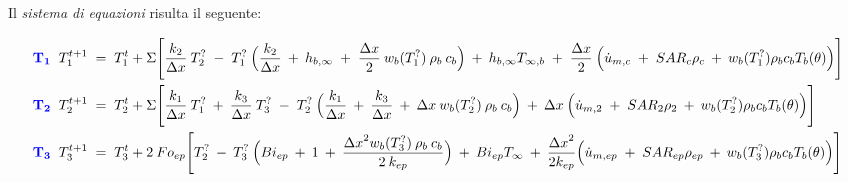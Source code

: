 \noindent
\hspace{1cm} Il \textit{sistema di equazioni} risulta il seguente:\\

\hspace{-1cm}
\begin{minipage}{\textwidth}
	{\footnotesize
	\begin{align*}
		\mbox{\textcolor{blue}{$\mathbf{T_{1}}$}} \;\;
		T_{1}^{t+1} \;&=\; T_1 ^t + \Sigma \Bigg[ \frac{k_{2}}{\Delta x}\: T_{2}^? \;-\; T_1^?\:\Big( \frac{k_{2}}{\Delta x} \:+\: h_{b,\infty} \;+\;  \frac{\Delta x}{2} \:  w_b (T_1^?) \: \rho _b \: c_b \Big) \:+\: h_{b, \infty} T_{\infty,b} \;+\; \frac{\Delta x}{2} \: \Big(\Dot{u}_{m,c} \;+\; SAR_{c} \rho_{c} \:+\:  w_b (T_1^?) \rho _b c_b T_b(\theta)\Big) \Bigg]\\
		\mbox{\textcolor{blue}{$\mathbf{T_{2}}$}} \;\;
		T_{2}^{t+1} \;&=\; T_2 ^t + \Sigma \Bigg[ \frac{k_{1}}{\Delta x} \: T_{1}^? \:+\: \frac{k_{3}}{\Delta x}\: T_{3}^? \;-\; T_2^?\:\Big(\frac{k_{1}}{\Delta x}  \:+\: \frac{k_{3}}{\Delta x} \:+\:  \Delta x \: w_b (T_2^?) \: \rho _b \: c_b \Big) \:+\: \Delta x \: \Big(\Dot{u}_{m,2} \;+\; SAR_{2} \rho_{2} \:+\:  w_b (T_2^?) \rho _b c_b T_b(\theta)\Big) \Bigg]\\
		\mbox{\textcolor{blue}{$\mathbf{T_{3}}$}} \;\;
		T_{3}^{t+1} \;&=\; T_3 ^t + 2 \: Fo_{ep} \Bigg[ T_{2}^? \:-\: T_3^? \:\Big(Bi_{ep} \:+\: 1 \:+\:  \frac{{\Delta x}^2 w_b (T_3^?) \: \rho _b \: c_b}{2 \: k_{ep}} \Big) \:+\: Bi_{ep} T_{\infty} \:+\: \frac{{\Delta x}^2}{2 k_{ep}} \Big(\Dot{u}_{m,ep} \;+\; SAR_{ep} \rho_{ep} \:+\:  w_b (T_3^?) \rho _b c_b T_b(\theta)\Big) \Bigg] \\
	\end{align*}
	}
\end{minipage}


